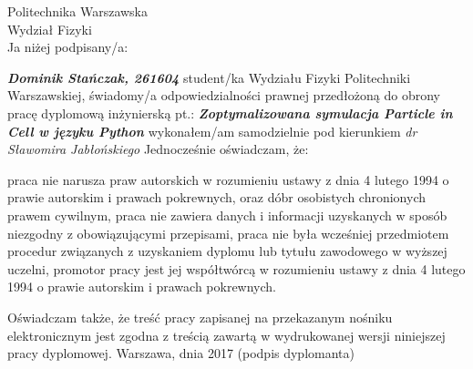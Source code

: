 \setcounter{page}{7}
\vspace{-1.5cm}
\begin{flushleft}
	Politechnika Warszawska \\
	Wydział Fizyki \\
	\vspace{0.5cm}
	Ja niżej podpisany/a:
\end{flushleft}
\center \textit{\textbf{Dominik Stańczak, 261604}} %
\justify student/ka Wydziału Fizyki Politechniki Warszawskiej, świadomy/a odpowiedzialności prawnej przedłożoną do obrony pracę dyplomową inżynierską pt.:
\center \textit{\textbf{Zoptymalizowana symulacja Particle in Cell w języku Python}} %
\justify wykonałem/am samodzielnie pod kierunkiem
\center \textit{dr Sławomira Jabłońskiego} %
\justify Jednocześnie oświadczam, że: \\
\begin{itemize}
	\itemi praca nie narusza praw autorskich w rozumieniu ustawy z dnia 4 lutego 1994 o prawie autorskim i prawach pokrewnych, oraz dóbr osobistych chronionych prawem cywilnym,
	\itemi praca nie zawiera danych i informacji uzyskanych w sposób niezgodny z obowiązującymi przepisami,
	\itemi praca nie była wcześniej przedmiotem procedur związanych z uzyskaniem dyplomu lub tytułu zawodowego w wyższej uczelni,
	\itemi promotor pracy jest jej współtwórcą w rozumieniu ustawy z dnia 4 lutego 1994 o prawie autorskim i prawach pokrewnych.
\end{itemize}
\justify Oświadczam także, że treść pracy zapisanej na przekazanym nośniku elektronicznym jest zgodna z treścią zawartą w wydrukowanej wersji niniejszej pracy dyplomowej.
\vfill
Warszawa, dnia 2017 \hfill (podpis dyplomanta) %

\newpage
\thispagestyle{empty}
\phantom{Nothing here}
\newpage
\clearpage
\phantom{Here neither}

